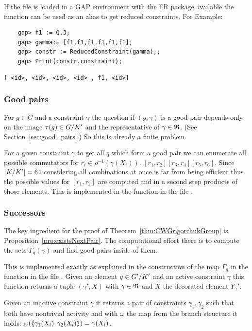 \documentclass[a4paper,11pt]{amsart}
\begin{document}
If the file  is loaded in a GAP environment with the FR package available 
the function  can be used as an alias to get 
reduced constraints. For Example:
 \begin{lstlisting}
    gap> f1 := Q.3;
    gap> gamma:= [f1,f1,f1,f1,f1,f1];
    gap> constr := ReducedConstraint(gamma);;
    gap> Print(constr.constraint);
\end{lstlisting} 
\begin{verbatim}
[ <id>, <id>, <id>, <id> , f1, <id>]
\end{verbatim} 

\subsubsection{Good pairs}
For $g\in G$ and a constraint $\gamma$ the question if $(g,\gamma)$ is a good
pair depends only on the image $\tau(g)\in{G/K'}$ and the representative
of $\gamma\in\mathfrak{R}$. (See Section~\ref{sec:good_pairs}.) So this is already a
finite problem. 

For a given constraint $\gamma$ to get all $q$ which form a good pair we can
enumerate all possible commutators for $r_i\in\rho^{-1}(\gamma(X_i))$.
$[r_1,r_2][r_3,r_4][r_5,r_6]$. Since $\lvert{K/K'}\rvert=64$ considering all 
combinations at once is far from being efficient thus the possible values for
$[r_1,r_2]$ are computed and in a second step products of those elements.
This is implemented in the function  in the file
.
\subsubsection{Successors}
The key ingredient for the proof of Theorem~\ref{thm:CWGrigorchukGroup} is
Proposition~\ref{pro:existsNextPair}. The computational effort there is
to compute the sets $\Gamma_q(\gamma)$ and find good pairs inside of them.

This is implemented exactly as explained in the construction of the map
$\Gamma_q$ in the function  in the file 
. Given an element $q\in{G'/K'}$ 
and an active constraint $\gamma$ this function returns a tuple $(\gamma',X)$ 
with $\gamma\in\mathfrak{R}$ and $X$ the decorated element $Y_\gamma'$.

Given an inactive constraint $\gamma$ it returns a pair of constraints
$\gamma_1,\gamma_2$ such that both have nontrivial activity and with
$\omega$ the map from the branch structure it holds:
$\omega(\langle\negthickspace\langle\gamma_1(X_i),\gamma_2(X_i)\rangle\negthickspace\rangle)=\gamma(X_i)$. 
\end{document}
